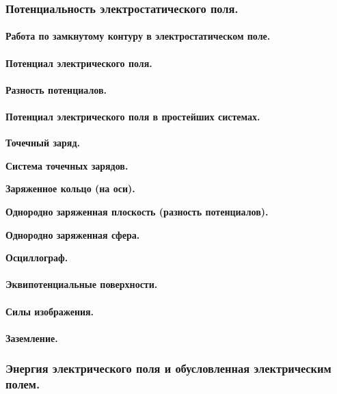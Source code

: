 \documentclass{article}
\begin{document}
        \subsubsection{Потенциальность электростатического поля.}
            \paragraph{Работа по замкнутому контуру в электростатическом поле.}
            \paragraph{Потенциал электрического поля.}
            \paragraph{Разность потенциалов.}
            \paragraph{Потенциал электрического поля в простейших системах.}
                \textbf{Точечный заряд.}
                
                \textbf{Система точечных зарядов.}
                
                \textbf{Заряженное кольцо (на оси).}
                
                \textbf{Однородно заряженная плоскость (разность потенциалов).}
                
                \textbf{Однородно заряженная сфера.}
                
                \textbf{Осциллограф.}
                
            \paragraph{Эквипотенциальные поверхности.}
            \paragraph{Силы изображения.}
            \paragraph{Заземление.}
        \subsubsection{Энергия электрического поля и обусловленная электрическим полем.}
\end{document}
